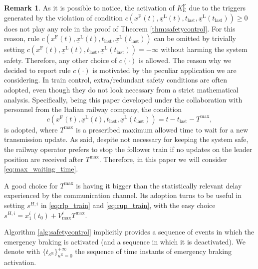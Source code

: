 \documentclass[letterpaper, 10 pt, conference]{ieeeconf}
\theoremstyle{definition}
\theoremstyle{nopoint}
\newtheorem*{remark}{Remark}
\newcounter{Theorem}
\begin{document}
\begin{remark}
As it is possible to notice, the activation of $K_\mathrm{E}^\mathrm{F}$ due to the triggers generated by 
the violation of condition $c(x^\mathrm{F}(t),\underline{x}^\mathrm{L}(t),t_{\mathrm{last}},\underline{x}^\mathrm{L}(t_{\mathrm{last}})) \geq 0$
does not play any role in the proof of Theorem \ref{thm:safetycontrol}. For this reason, rule $c(x^\mathrm{F}(t),\underline{x}^\mathrm{L}(t),t_{\mathrm{last}},\underline{x}^\mathrm{L}(t_{\mathrm{last}}))$ can be omitted by trivially setting $c(x^\mathrm{F}(t),\underline{x}^\mathrm{L}(t),t_{\mathrm{last}},\underline{x}^\mathrm{L}(t_{\mathrm{last}}))=-\infty$ without harming the system safety. Therefore, any other choice of $c(\cdot)$ is allowed. 
The reason why we decided to report rule $c(\cdot)$ is motivated by the peculiar application we are considering. In train control, extra/redundant safety conditions are often adopted, even though they do not look necessary from a strict mathematical analysis. 
Specifically, being this paper developed under the collaboration with personnel from the Italian railway company, the condition
\begin{equation}\label{eq:max_waiting_time}
c(x^\mathrm{F}(t),\underline{x}^\mathrm{L}(t),t_{\mathrm{last}},\underline{x}^\mathrm{L}(t_{\mathrm{last}}))= t-t_{\mathrm{last}}-T^{\max},
\end{equation}
is adopted, where $T^{\max}$ is a prescribed maximum allowed time to wait for a new transmission update. 
As said, despite not necessary for keeping the system safe, the railway operator prefers to stop the follower train if no updates on the leader position are received after $T^{\max}$. Therefore, in this paper we will consider \eqref{eq:max_waiting_time}.
\end{remark}

A good choice for $T^{\max}$ is having it bigger than the statistically relevant delay experienced by the communication channel.
Its adoption turns to be useful in setting $s^{H,i}$ in \eqref{eq:rlp_train} and \eqref{eq:rup_train}, with the easy choice $s^{H,i}=x_1^i(t_0)+V^i_{\max} T^{\max}$.

Algorithm \ref{alg:safetycontrol} implicitly provides a sequence of events in which the emergency braking is activated (and a sequence in which it is deactivated). We denote with 
$\{ t_{\kappa^\mathrm{E}} \}_{\kappa^\mathrm{E} =0}^{+\infty}$ the sequence of time instants of emergency braking activation. 
\end{document}
